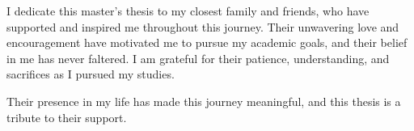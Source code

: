 
\begin{dedication}
I dedicate this master's thesis to my closest family and friends, who have supported and inspired me throughout this journey. Their unwavering love and encouragement have motivated me to pursue my academic goals, and their belief in me has never faltered. I am grateful for their patience, understanding, and sacrifices as I pursued my studies. 

Their presence in my life has made this journey meaningful, and this thesis is a tribute to their support. 

\newpage

\end{dedication}

